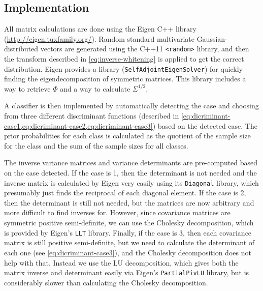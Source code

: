 \documentclass[headings=optiontoheadandtoc,listof=totoc,parskip=full]{scrartcl}
\begin{document}
\subsection{Implementation}

All matrix calculations are done using the Eigen C++ library (\url{http://eigen.tuxfamily.org/}). Random standard multivariate Gaussian-distributed vectors are generated using the C++11 \texttt{<random>} library, and then the transform described in \cref{eq:inverse-whitening} is applied to get the correct distribution. Eigen provides a library (\texttt{SelfAdjointEigenSolver}) for quickly finding the eigendecomposition of symmetric matrices. This library includes a way to retrieve $\Phi$ and a way to calculate $\Sigma^{1/2}$.

A classifier is then implemented by automatically detecting the case and choosing from three different discriminant functions (described in \cref{eq:dicriminant-case1,eq:dicriminant-case2,eq:dicriminant-case3}) based on the detected case. The prior probabilities for each class is calculated as the quotient of the sample size for the class and the sum of the sample sizes for all classes.

The inverse variance matrices and variance determinants are pre-computed based on the case detected. If the case is 1, then the determinant is not needed and the inverse matrix is calculated by Eigen very easily using its \texttt{Diagonal} library, which presumably just finds the reciprocal of each diagonal element. If the case is 2, then the determinant is still not needed, but the matrices are now arbitrary and more difficult to find inverses for. However, since covariance matrices are symmetric positive semi-definite, we can use the Cholesky decomposition, which is provided by Eigen's \texttt{LLT} library. Finally, if the case is 3, then each covariance matrix is still positive semi-definite, but we need to calculate the determinant of each one (see \cref{eq:dicriminant-case3}), and the Cholesky decomposition does not help with that. Instead we use the LU decomposition, which gives both the matrix inverse and determinant easily via Eigen's \texttt{PartialPivLU} library, but is considerably slower than calculating the Cholesky decomposition.
\end{document}
